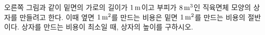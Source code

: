 \noindent\begin{minipage}[t]{0.58\linewidth}\vspace{0pt}\raggedright 오른쪽 그림과 같이 밑면의 가로의 길이가 $1\mkern3mu \mathrm{m}$이고 부피가 $8\mkern3mu \mathrm{m}^3$인 직육면체 모양의 상자를 만들려고 한다. 이때 옆면 $1\mkern3mu \mathrm{m}^2$를 만드는 비용은 밑면 $1\mkern3mu \mathrm{m}^2$를 만드는 비용의 절반이다. 상자를 만드는 비용이 최소일 때, 상자의 높이를 구하시오. \end{minipage}\hfill\begin{minipage}[t]{0.4\linewidth}\vspace{0pt}\centering \resizebox{\ifdim\width>\linewidth\linewidth\else\width\fi}{!}{}\end{minipage}\par

